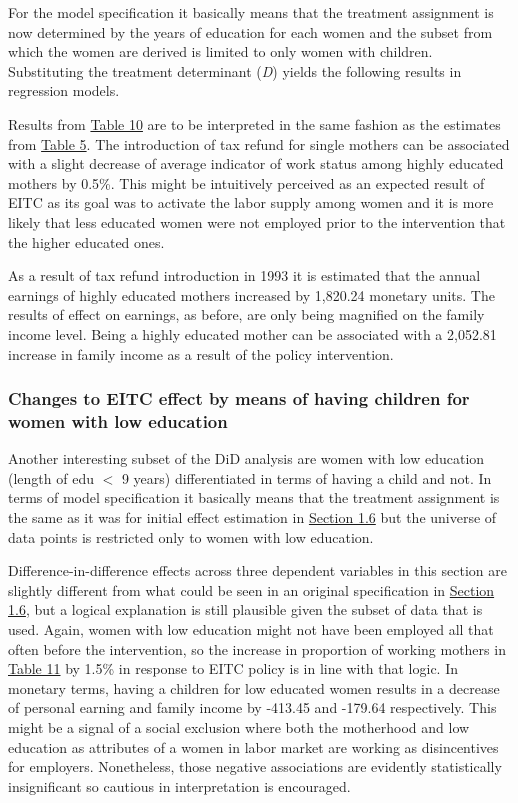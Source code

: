 \documentclass{article}
\begin{document}
For the model specification it basically means that the treatment assignment is now determined by the years of education for each women and the subset from which the women are derived is limited to only women with children. Substituting the treatment determinant (\textit{D}) yields the following results in regression models.


Results from \hyperref[tab:highed]{Table 10} are to be interpreted in the same fashion as the estimates from \hyperref[tab:summaryEITC]{Table 5}. The introduction of tax refund for single mothers can be associated with a slight decrease of average indicator of work status among highly educated mothers by 0.5\%. This might be intuitively perceived as an expected result of EITC as its goal was to activate the labor supply among women and it is more likely that less educated women were not employed prior to the intervention that the higher educated ones.

As a result of tax refund introduction in 1993 it is estimated that the annual earnings of highly educated mothers increased by 1,820.24 monetary units. The results of effect on earnings, as before, are only being magnified on the family income level. Being a highly educated mother can be associated with a 2,052.81 increase in family income as a result of the policy intervention. 

\subsubsection{Changes to EITC effect by means of having children for women with low education}

Another interesting subset of the DiD analysis are women with low education (length of edu $<$ 9 years) differentiated in terms of having a child and not. In terms of model specification it basically means that the treatment assignment is the same as it was for initial effect estimation in \hyperref[basicDiD]{Section 1.6} but the universe of data points is restricted only to women with low education. 

Difference-in-difference effects across three dependent variables in this section are slightly different from what could be seen in an original specification in \hyperref[basicDiD]{Section 1.6}, but a logical explanation is still plausible given the subset of data that is used. Again, women with low education might not have been employed all that often before the intervention, so the increase in proportion of working mothers in \hyperref[tab:lowed]{Table 11} by 1.5\% in response to EITC policy is in line with that logic. In monetary terms, having a children for low educated women results in a decrease of personal earning and family income by -413.45 and -179.64 respectively. This might be a signal of a social exclusion where both the motherhood and low education as attributes of a women in labor market are working as disincentives for employers. Nonetheless, those negative associations are evidently statistically insignificant so cautious in interpretation is encouraged.
\end{document}
